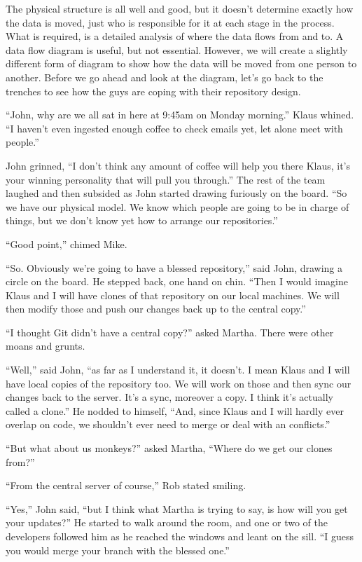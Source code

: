 The physical structure is all well and good, but it doesn't determine exactly how the data is moved, just who is responsible for it at each stage in the process.
What is required, is a detailed analysis of where the data flows from and to.
A data flow diagram is useful, but not essential.
However, we will create a slightly different form of diagram to show how the data will be moved from one person to another.
Before we go ahead and look at the diagram, let's go back to the trenches to see how the guys are coping with their repository design.

\begin{trenches}
``John, why are we all sat in here at 9:45am on Monday morning.'' Klaus whined.
``I haven't even ingested enough coffee to check emails yet, let alone meet with people.''

John grinned, ``I don't think any amount of coffee will help you there Klaus, it's your winning personality that will pull you through.''
The rest of the team laughed and then subsided as John started drawing furiously on the board.
``So we have our physical model. We know which people are going to be in charge of things, but we don't know yet how to arrange our repositories.''

``Good point,'' chimed Mike.

``So. Obviously we're going to have a blessed repository,'' said John, drawing a circle on the board.
He stepped back, one hand on chin.
``Then I would imagine Klaus and I will have clones of that repository on our local machines. We will then modify those and push our changes back up to the central copy.''

``I thought Git didn't have a central copy?'' asked Martha.
There were other moans and grunts.

``Well,'' said John,
``as far as I understand it, it doesn't. I mean Klaus and I will have local copies of the repository too. We will work on those and then sync our changes back to the server. It's a sync, moreover a copy. I think it's actually called a clone.''
He nodded to himself, ``And, since Klaus and I will hardly ever overlap on code, we shouldn't ever need to merge or deal with an conflicts.''

``But what about us monkeys?'' asked Martha,
``Where do we get our clones from?''

``From the central server of course,'' Rob stated smiling.

``Yes,'' John said,
``but I think what Martha is trying to say, is how will you get your updates?''
He started to walk around the room, and one or two of the developers followed him as he reached the windows and leant on the sill.
``I guess you would merge your branch with the blessed one.''


\end{trenches}
